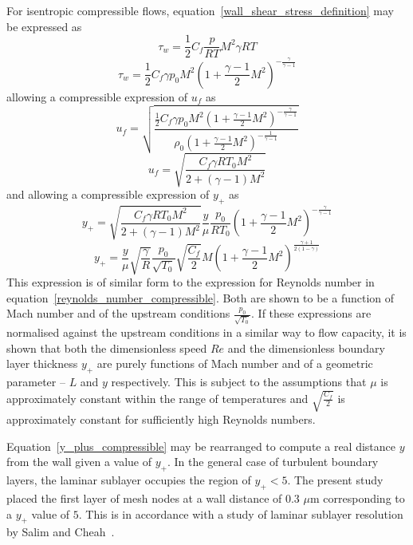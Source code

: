 \documentclass[a4paper, 11pt, oneside]{report}
\begin{document}
For isentropic compressible flows, equation~\ref{wall_shear_stress_definition} may be expressed as
\begin{equation}
\tau_w =
\frac{1}{2}
C_f
\frac{p}{RT}
M^2
\gamma
RT
\end{equation}
\begin{equation}
\tau_w =
\frac{1}{2}
C_f
\gamma
p_0
M^2
\left(
	1 +
	\frac{\gamma-1}{2}
	M^2
\right)
^{-\frac{\gamma}{\gamma-1}}
\end{equation}
allowing a compressible expression of $u_f$ as
\begin{equation}
u_f = 
\sqrt{
	\frac{
		\frac{1}{2}
		C_f
		\gamma
		p_0
		M^2
		\left(
			1 +
			\frac{\gamma-1}{2}
			M^2
		\right)
		^{-\frac{\gamma}{\gamma-1}}
	}{
		\rho_0
		\left(
			1 +
			\frac{\gamma-1}{2}
			M^2
		\right)
		^{-\frac{1}{\gamma-1}}
	}
}
\end{equation}
\begin{equation}
u_f = 
\sqrt{
	\frac{
		C_f
		\gamma
		R
		T_0
		M^2
	}{
		2 +
		\left(\gamma-1\right)
		M^2
	}
}
\end{equation}
and allowing a compressible expression of $y_+$ as
\begin{equation}
y_+ = 
\sqrt{
	\frac{
		C_f
		\gamma
		R
		T_0
		M^2
	}{
		2 +
		\left(\gamma-1\right)
		M^2
	}
}
\frac{y}{\mu}
\frac{p_0}{R T_0}
\left(
	1 +
	\frac{\gamma-1}{2}
	M^2
\right)
^{-\frac{\gamma}{\gamma-1}}
\end{equation}
\begin{equation}\label{y_plus_compressible}
y_+ =
\frac{y}{\mu}
\sqrt{\frac{\gamma}{R}}
\frac{p_0}{\sqrt{T_0}}
\sqrt{\frac{C_f}{2}}
M
\left(
	1 +
	\frac{\gamma-1}{2}
	M^2
\right)
^{\frac{\gamma+1}{2(1-\gamma)}}
\end{equation}
This expression is of similar form to the expression for Reynolds number in equation~\ref{reynolds_number_compressible}. Both are shown to be a function of Mach number and of the upstream conditions $\frac{p_0}{\sqrt{T_0}}$. If these expressions are normalised against the upstream conditions in a similar way to flow capacity, it is shown that both the dimensionless speed $Re$ and the dimensionless boundary layer thickness $y_+$ are purely functions of Mach number and of a geometric parameter -- $L$ and $y$ respectively. This is subject to the assumptions that $\mu$ is approximately constant within the range of temperatures and $\sqrt{\frac{C_f}{2}}$ is approximately constant for sufficiently high Reynolds numbers.

Equation~\ref{y_plus_compressible} may be rearranged to compute a real distance $y$ from the wall given a value of $y_+$. In the general case of turbulent boundary layers, the laminar sublayer occupies the region of $y_+ < 5$. The present study placed the first layer of mesh nodes at a wall distance of 0.3 $\mu$m corresponding to a $y_+$ value of $5$. This is in accordance with a study of laminar sublayer resolution by Salim and Cheah~\cite{salim_y_plus}.
\end{document}
